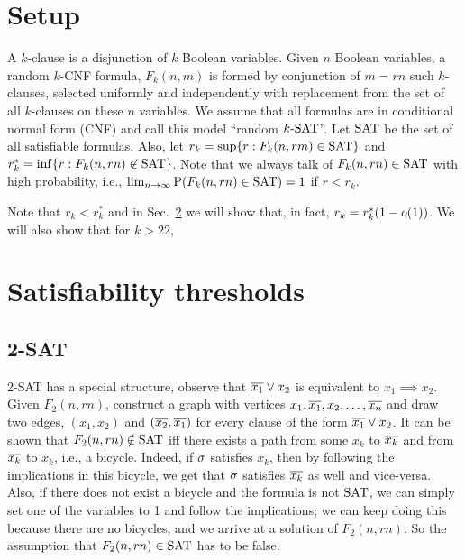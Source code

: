 \documentclass[letterpaper, 10pt, twocolumn, reqno]{amsart}
\begin{document}
\section{Setup}
\label{sec:setup}
A $k$-clause is a disjunction of $k$ Boolean variables. Given $n$ Boolean
variables, a random $k$-CNF formula, $F_k(n, m)$ is formed by conjunction of $m = rn$ such $k$-clauses, selected uniformly and independently with
replacement from the set of all $k$-clauses on these $n$ variables. We assume that all formulas are in conditional normal form (CNF) and call this model ``random $k\textrm{-SAT}$''. Let $\textrm{SAT}$ be the set of all satisfiable formulas. Also,
let $r_k = \sup \{ r: F_k(n, rm) \in \textrm{SAT} \}$ and $r_k^* = \inf \{ r: F_k(n, rn) \not\in \textrm{SAT} \}$. Note that we always talk of $F_k(n,rn) \in \textrm{SAT}$ with high probability, i.e., $\lim_{n\to \infty} \textrm{P}(F_k(n,rn) \in \textrm{SAT}) = 1$ if $r < r_k$.

Note that $r_k < r_k^*$ and in Sec.~\ref{sec:sat_thresh}
we will show that, in fact, $r_k = r_k^*(1-o(1))$. We will also show that for $k > 22$,

\section{Satisfiability thresholds}
\label{sec:sat_thresh}


\subsection{2-SAT}
\label{ssec:2sat}
2-SAT has a special structure, observe that $\overline{x_1} \vee x_2$ is equivalent to $x_1 \implies x_2$. Given $F_2(n, rn)$, construct a graph with
vertices $x_1, \overline{x_1}, x_2, \ldots, \overline{x_n}$ and draw two edges, $(x_1, x_2)$ and $(\overline{x_2}, \overline{x_1})$ for every clause of the form $\overline{x_1} \vee x_2$. It can be shown that $F_2(n,rn) \notin \textrm{SAT}$ iff
there exists a path from some $x_k$ to $\overline{x_k}$ and from $\overline{x_k}$ to $x_k$, i.e., a bicycle. Indeed, if $\sigma$ satisfies $x_k$, then by following the implications in this bicycle,
we get that $\sigma$ satisfies $\overline{x_k}$ as well and vice-versa. Also, if there does not exist a bicycle and the formula is not $\textrm{SAT}$, we can simply set one of the
variables to 1 and follow the implications; we can keep doing this because there are no bicycles, and we arrive at a solution of $F_2(n, rn)$. So the
assumption that $F_2(n,rn) \in \textrm{SAT}$ has to be false.
\end{document}
